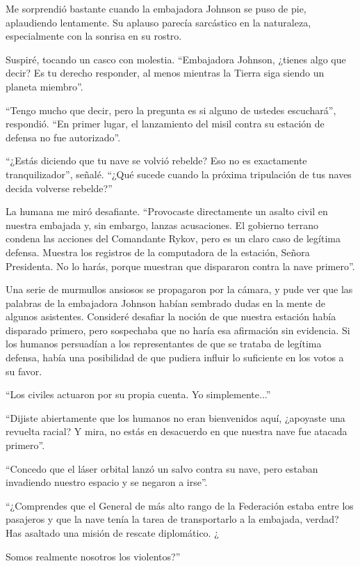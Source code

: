 \documentclass[spanish,12pt,a4paper,oneside,titlepage]{book}
\begin{document}
    Me sorprendió bastante cuando la embajadora Johnson se puso de pie, aplaudiendo lentamente. Su aplauso parecía sarcástico en la naturaleza, especialmente con la sonrisa en su rostro.

    Suspiré, tocando un casco con molestia. ``Embajadora Johnson, ¿tienes algo que decir? Es tu derecho responder, al menos mientras la Tierra siga siendo un planeta miembro''.

    ``Tengo mucho que decir, pero la pregunta es si alguno de ustedes escuchará'', respondió. ``En primer lugar, el lanzamiento del misil contra su estación de defensa no fue autorizado''.

    ``¿Estás diciendo que tu nave se volvió rebelde? Eso no es exactamente tranquilizador'', señalé. ``¿Qué sucede cuando la próxima tripulación de tus naves decida volverse rebelde?''

    La humana me miró desafiante. ``Provocaste directamente un asalto civil en nuestra embajada y, sin embargo, lanzas acusaciones. El gobierno terrano condena las acciones del Comandante Rykov, pero es un claro caso de legítima defensa. Muestra los registros de la computadora de la estación, Señora Presidenta. No lo harás, porque muestran que dispararon contra la nave primero''.

    Una serie de murmullos ansiosos se propagaron por la cámara, y pude ver que las palabras de la embajadora Johnson habían sembrado dudas en la mente de algunos asistentes. Consideré desafiar la noción de que nuestra estación había disparado primero, pero sospechaba que no haría esa afirmación sin evidencia. Si los humanos persuadían a los representantes de que se trataba de legítima defensa, había una posibilidad de que pudiera influir lo suficiente en los votos a su favor.

    ``Los civiles actuaron por su propia cuenta. Yo simplemente...''

    ``Dijiste abiertamente que los humanos no eran bienvenidos aquí, ¿apoyaste una revuelta racial? Y mira, no estás en desacuerdo en que nuestra nave fue atacada primero''.

    ``Concedo que el láser orbital lanzó un salvo contra su nave, pero estaban invadiendo nuestro espacio y se negaron a irse''.

    ``¿Comprendes que el General de más alto rango de la Federación estaba entre los pasajeros y que la nave tenía la tarea de transportarlo a la embajada, verdad? Has asaltado una misión de rescate diplomático. ¿

    Somos realmente nosotros los violentos?''
\end{document}
